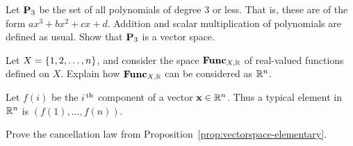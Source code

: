 \begin{ex}
  Let $\mathbf{P}_{3}$ be the set of all polynomials of degree 3 or
  less. That is, these are of the form $ax^3+bx^2+cx+d$. Addition and
  scalar multiplication of polynomials are defined as usual.  Show
  that $\mathbf{P}_{3}$ is a vector space.
\end{ex}

\begin{ex}
  Let $X=\left\{1,2,\ldots,n\right\}$, and consider the space $\mathbf{Func}_{X,\mathbb{R}}$ of
  real-valued functions defined on $X$. Explain how $\mathbf{Func}_{X,\mathbb{R}}$ can be
  considered as $\mathbb{R}^{n}$.
  \begin{sol}
    Let $f(i)$ be the $i^{\,\rm th}$ component of a vector
    $\mbox{\bf x}\in\mathbb{R}^{n}$. Thus a typical element in $\mathbb{R}^{n}$ is
    $ (f(1),\ldots,f(n))$.
  \end{sol}
\end{ex}

\begin{ex}
  Prove the cancellation law from
  Proposition~\ref{prop:vectorspace-elementary}.
\end{ex}
